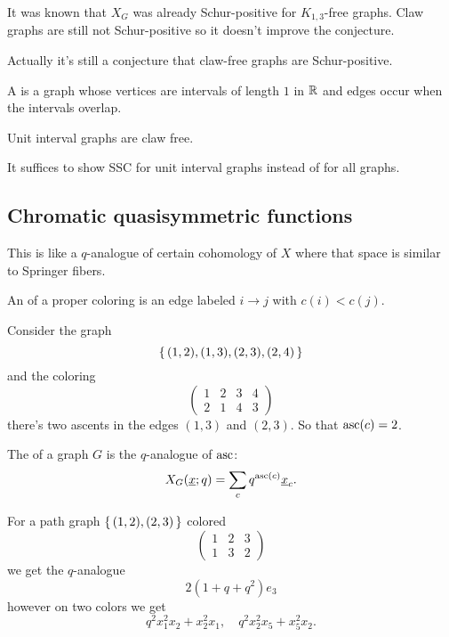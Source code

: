\documentclass[12pt]{memoir}
\begin{document}
It was known that $X_G$ was already Schur-positive for $K_{1,3}$-free graphs. Claw graphs are still not Schur-positive so it doesn't improve the conjecture. 

\begin{Rmk}
    Actually it's still a conjecture that claw-free graphs are Schur-positive.
\end{Rmk}

\begin{Def}
    A  is a graph whose vertices are intervals of length $1$ in $\mathbb{R}$ and edges occur when the intervals overlap.
\end{Def}

\begin{Lem}
    Unit interval graphs are claw free.
\end{Lem}

\begin{Th}
    It suffices to show SSC for unit interval graphs instead of for all graphs.
\end{Th}

\subsection{Chromatic quasisymmetric functions}

This is like a $q$-analogue of certain cohomology of $X$ where that space is similar to Springer fibers. 

\begin{Def}
    An  of a proper coloring is an edge labeled $i\to j$ with $c(i)<c(j)$.
\end{Def}

\begin{Ex}
    Consider the graph 
    $$\{\,(1,2),(1,3),(2,3),(2,4)\,\}$$
    and the coloring 
    $$\begin{pmatrix}
        1&2&3&4\\
        2&1&4&3
    \end{pmatrix}$$
    there's two ascents in the edges $(1,3)$ and $(2,3)$. So that $\operatorname{asc}(c)=2$.
\end{Ex}

\begin{Def}
    The  of a graph $G$ is the $q$-analogue of $\operatorname{asc}$:
    $$X_G(\underline x;q)=\sum_{c}q^{\operatorname{asc}(c)}\underline x_{c}.$$
\end{Def}

\begin{Ex}
    For a path graph $\{\,(1,2),(2,3)\,\}$ colored
    $$\begin{pmatrix}
        1&2&3\\
        1&3&2
    \end{pmatrix}$$
    we get the $q$-analogue
    $$2(1+q+q^2)e_3$$
    however on two colors we get 
    $$q^2x_1^2x_2+x_2^2x_1,\quad q^2x_2^2x_5+x_5^2x_2.$$
\end{Ex}
\end{document}
